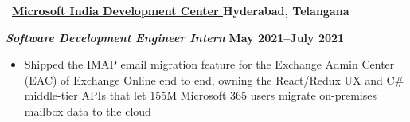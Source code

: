 \textbf{\faMicrosoft\ \href{https://drive.google.com/file/d/1gODXySdp2avidgaqdYoAZkQoI1WidLVp/view?usp=sharing}{Microsoft India Development Center } \hfill Hyderabad, Telangana}\par
\textit{\textbf{Software Development Engineer Intern}} \hfill \textbf{May 2021--July 2021}\par
\begin{itemize}
	\item Shipped the IMAP email migration feature for the Exchange Admin Center (EAC) of Exchange Online end to end, owning the React/Redux UX and C\# middle-tier APIs that let 155M Microsoft 365 users migrate on-premises mailbox data to the cloud
\end{itemize}\par